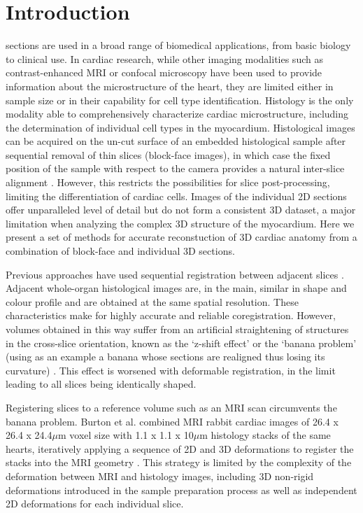 \section{Introduction} %
\label{sec:introduction}
   sections are used in a broad range of biomedical applications, from basic biology to clinical use. In cardiac research, while other imaging modalities such as contrast-enhanced MRI \cite{Gilbert2012} or confocal microscopy \cite{Hooks2002,Rutherford2012} have been used to provide information about the microstructure of the heart, they are limited either in sample size or in their capability for cell type identification. Histology is the only modality able to comprehensively characterize cardiac microstructure, including the determination of individual cell types in the myocardium. 
  Histological images can be acquired on the un-cut surface of an embedded histological sample after sequential removal of thin slices (block-face images), in which case the fixed position of the sample with respect to the camera provides a natural inter-slice alignment \cite{Sands2005,Sands2006,Rutherford2012}. However, this restricts the possibilities for slice post-processing, limiting the differentiation of cardiac cells. Images of the individual 2D sections offer unparalleled level of detail \cite{Burton2006,Plank2009} but do not form a consistent 3D dataset, a major limitation when analyzing the complex 3D structure of the myocardium. Here we present a set of methods for accurate reconstuction of 3D cardiac anatomy from a combination of block-face and individual 3D sections.
  
  Previous approaches have used sequential registration between adjacent slices \cite{Chakravarty2006,Schmitt2006,Cifor2009,Cifor2011}. Adjacent whole-organ histological images are, in the main, similar in shape and colour profile and are obtained at the same spatial resolution. These characteristics make for highly accurate and reliable coregistration. However, volumes obtained in this way suffer from an artificial straightening of structures in the cross-slice orientation, known as the `z-shift effect' \cite{Yushkevich2006} or the `banana problem' (using as an example a banana whose sections are realigned thus losing its curvature) \cite{Malandain2004,Lyon2012}. This effect is worsened with deformable registration, in the limit leading to all slices being identically shaped.
  
  Registering slices to a reference volume such as an MRI scan \cite{Alic2011,Osechinskiy2011,Kimm2012} circumvents the banana problem. Burton et al. \cite{Burton2006} combined MRI rabbit cardiac images of 26.4 x 26.4 x 24.4$\mu$m voxel size with 1.1 x 1.1 x 10$\mu$m histology stacks of the same hearts, iteratively applying a sequence of 2D and 3D deformations to register the stacks into the MRI geometry \cite{Mansoori2007}. This strategy is limited by the complexity of the deformation between MRI and histology images, including 3D non-rigid deformations introduced in the sample preparation process as well as independent 2D deformations for each individual slice.
  
